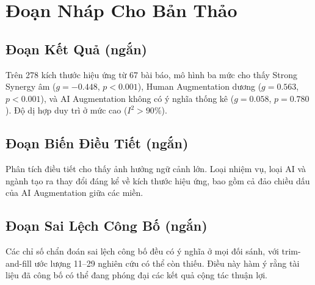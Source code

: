 \section*{Đoạn Nháp Cho Bản Thảo}
\subsection*{Đoạn Kết Quả (ngắn)}
Trên 278 kích thước hiệu ứng từ 67 bài báo, mô hình ba mức cho thấy Strong Synergy âm (\(g=-0.448\), \(p<0.001\)), Human Augmentation dương (\(g=0.563\), \(p<0.001\)), và AI Augmentation không có ý nghĩa thống kê (\(g=0.058\), \(p=0.780\)). Độ dị hợp duy trì ở mức cao (\(I^2>90\%\)).

\subsection*{Đoạn Biến Điều Tiết (ngắn)}
Phân tích điều tiết cho thấy ảnh hưởng ngữ cảnh lớn. Loại nhiệm vụ, loại AI và ngành tạo ra thay đổi đáng kể về kích thước hiệu ứng, bao gồm cả đảo chiều dấu của AI Augmentation giữa các miền.

\subsection*{Đoạn Sai Lệch Công Bố (ngắn)}
Các chỉ số chẩn đoán sai lệch công bố đều có ý nghĩa ở mọi đối sánh, với trim-and-fill ước lượng 11--29 nghiên cứu có thể còn thiếu. Điều này hàm ý rằng tài liệu đã công bố có thể đang phóng đại các kết quả cộng tác thuận lợi.

